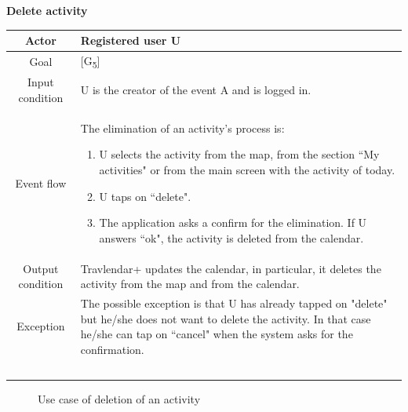 \documentclass[12pt,titlepage]{article}
\begin{document}
\begin{flushleft}
\textbf{Delete activity}
\end{flushleft}

\begin{tabular}{cp{10cm}} 
Actor&Registered user U \\ \hline 
Goal& {[G\textsubscript{5}]}\\ \hline
Input condition&U is the creator of the event A and is logged in.\\ \hline
Event flow&The elimination of an activity's process is: 
\begin{enumerate}
\item U selects the activity from the map, from the section ``My activities" or from the main screen with the activity of today.
\item U taps on ``delete". 
\item The application asks a confirm for the elimination. If U answers ``ok", the activity is deleted from the calendar.
\end{enumerate}\\ \hline
Output condition& Travlendar+ updates the calendar, in particular, it deletes the activity from the map and from the calendar.
\\ \hline
Exception& The possible exception is that U has already tapped on "delete" but he/she does not want to delete the activity. In that case he/she can tap on ``cancel" when the system asks for the confirmation.
\\ \hline \

\end{tabular}
\pagebreak 
\begin{figure}
\centering
{}
\caption{Use case of deletion of an activity}

\end{figure}
\end{document}
